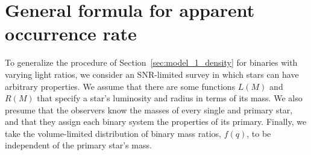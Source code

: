 \documentclass[12pt,modern]{aastex61}
\begin{document}
\section{General formula for apparent occurrence rate}
\label{sec:general_formula}

To generalize the procedure of Section~\ref{sec:model_1_density} for
binaries with varying light ratios, we consider an SNR-limited survey
in which stars can have arbitrary properties.  We assume that there
are some functions $L(M)$ and $R(M)$ that specify a star's luminosity
and radius in terms of its mass. We also presume that the observers
know the masses of every single and primary star, and that they assign
each binary system the properties of its primary.  Finally, we take
the volume-limited distribution of binary mass ratios, $f(q)$, to be
independent of the primary star's mass.
\end{document}
